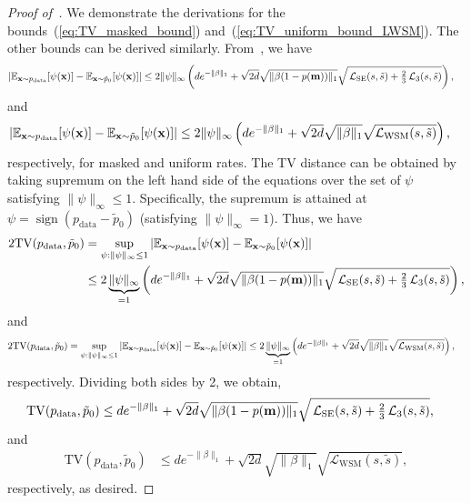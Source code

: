 \documentclass{article} %
\def\eqref#1{equation~\ref{#1}}
\DeclareMathOperator{\sign}{sign}
\newcommand{\bfx}{{\bf x}}
\newcommand{\bfm}{{\bf m}}
\newcommand{\TV}{\mathrm{TV}}
\newcommand{\LWSM}{\mathcal{L}_{\mathrm{WSM}}}
\newcommand{\LSE}{\mathcal{L}_{\mathrm{SE}}}
\renewcommand{\eqref}[1]{\textup{(\ref{#1})}}
\newcommand{\LThree}{\mathcal{L}_{3}}
\begin{document}
\begin{proof}[Proof of~]
We demonstrate the derivations for the bounds~\eqref{eq:TV_masked_bound} and~\eqref{eq:TV_uniform_bound_LWSM}. The other bounds can be derived similarly.
From~, we have
\begin{align*}
    \left| \mathbb{E}_{\bfx \sim p_{\mathrm{data}}}[\psi(\bfx)] - \mathbb{E}_{\bfx \sim \tilde{p}_0}[\psi(\bfx)] \right| &\leq 2 \|\psi\|_\infty \left( d e^{-\| \beta \|_1}  +  \sqrt{2d} \sqrt{\| \beta (1-p(\bfm))\|_1}   \sqrt{ \,\LSE(s, \tilde{s}) + \tfrac{2}{3}\,\LThree(s, \tilde{s}) } \right),
\end{align*}
and
\begin{align*}
\left| \mathbb{E}_{\bfx \sim p_{\mathrm{data}}}[\psi(\bfx)] - \mathbb{E}_{\bfx \sim \tilde{p}_0}[\psi(\bfx)] \right| &\leq 2 \|\psi\|_\infty \left( d e^{-\| \beta \|_1}  +  \sqrt{2d} \sqrt{\|\beta \|_1}  \sqrt{\LWSM(s, \tilde{s})} \right),
\end{align*}
respectively, for masked and uniform rates. The TV distance can be obtained by taking supremum on the left hand side of the equations over the set of $\psi$ satisfying $\| \psi \|_\infty \leq 1$. Specifically, the supremum is attained at $\psi=\sign(p_{\mathrm{data}} - \tilde{p}_0)$ (satisfying $\| \psi \|_\infty = 1$). Thus, we have
\begin{align*}
    2\TV(p_{\mathrm{data}}, \tilde{p}_0) &=\sup_{\psi: \| \psi \|_\infty \leq 1}  \left| \mathbb{E}_{\bfx \sim p_{\mathrm{data}}}[\psi(\bfx)] - \mathbb{E}_{\bfx \sim \tilde{p}_0}[\psi(\bfx)] \right| \\
    &\leq 2 \underbrace{\|\psi\|_\infty}_{=1} \left( d e^{-\| \beta \|_1}  +  \sqrt{2d} \sqrt{\| \beta (1-p(\bfm))\|_1}   \sqrt{ \,\LSE(s, \tilde{s}) + \tfrac{2}{3}\,\LThree(s, \tilde{s}) } \right),
\end{align*}
and 
\begin{align*}
2\TV(p_{\mathrm{data}}, \tilde{p}_0) =\sup_{\psi: \| \psi \|_\infty \leq 1}  \left| \mathbb{E}_{\bfx \sim p_{\mathrm{data}}}[\psi(\bfx)] - \mathbb{E}_{\bfx \sim \tilde{p}_0}[\psi(\bfx)] \right| &\leq 2 \underbrace{\|\psi\|_\infty}_{=1} \left( d e^{-\| \beta \|_1}  +  \sqrt{2d} \sqrt{\|\beta \|_1}  \sqrt{\LWSM(s, \tilde{s})} \right),
\end{align*}
respectively. Dividing both sides by 2, we obtain,
\begin{align*}
    \TV(p_{\mathrm{data}}, \tilde{p}_0)  &\leq   d e^{-\| \beta \|_1}  +  \sqrt{2d} \sqrt{\| \beta (1-p(\bfm))\|_1}     \sqrt{ \,\LSE(s, \tilde{s}) + \tfrac{2}{3}\,\LThree(s, \tilde{s}) } ,
\end{align*}
and
\begin{align*}
\TV(p_{\mathrm{data}}, \tilde{p}_0) &\leq d e^{-\| \beta \|_1}  +  \sqrt{2d} \sqrt{\|\beta \|_1}  \sqrt{\LWSM(s, \tilde{s})} ,
\end{align*}
respectively, 
as desired.
\end{proof}
\end{document}
